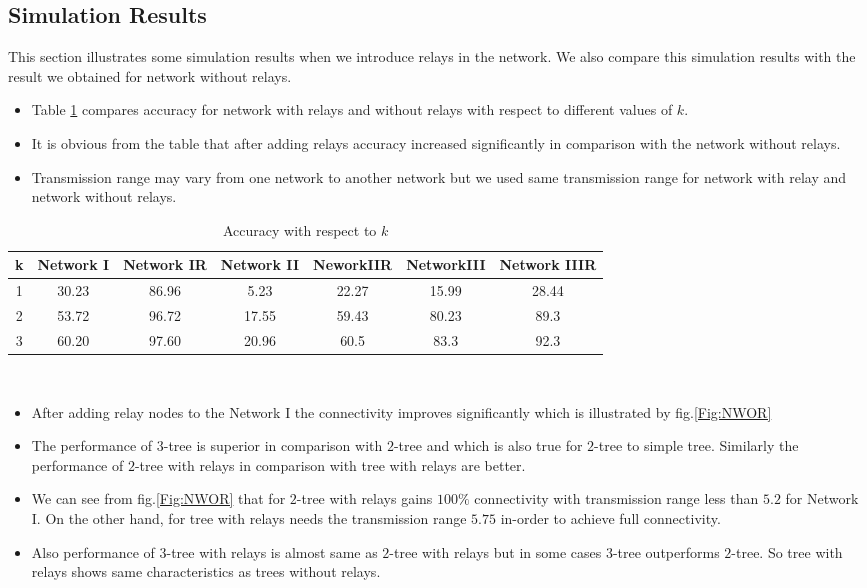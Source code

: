 \documentclass[12pt]{article}
\begin{document}
\subsection{Simulation Results}
This section illustrates some simulation results when we introduce relays in the network. We also compare this simulation results with the result we obtained for network without relays.
\begin{itemize}
\item Table \ref{Tab:SRC} compares accuracy for network with relays and without relays with respect to different values of $k$.
\item It is obvious from the table that after adding relays accuracy increased significantly in comparison with the network without relays.
\item Transmission range may vary from one network to another network but we used same transmission range for network with relay and network without relays. 

\end{itemize}


\begin{table}
 \begin{minipage}{.5\linewidth}

      \centering
     \begin{tabular}{|c|c|c|c|c|c|c|}
     \hline
     k & Network I & Network IR & Network II & NeworkIIR & NetworkIII & Network IIIR \\
     \hline
      1 & 30.23 & 86.96 & 5.23 &22.27  &15.99 & 28.44\\\hline
	  2 & 53.72 & 96.72 & 17.55 & 59.43& 80.23&89.3\\\hline
	  3 &60.20 & 97.60 & 20.96 & 60.5& 83.3&92.3\\\hline
\end{tabular}
    \end{minipage}\\
      \caption{Accuracy with respect to $k$}
      \label{Tab:SRC}   
\end{table}   
\begin{itemize}
\item After adding relay nodes to the Network I the connectivity improves significantly which is illustrated by fig.\ref{Fig:NWOR}
\item The performance of $3$-tree is superior in comparison with $2$-tree and which is also true for $2$-tree to simple tree. Similarly the performance of $2$-tree with relays in comparison with tree with relays are better.
\item  We can see from fig.\ref{Fig:NWOR} that for $2$-tree with relays gains $100\%$ connectivity with transmission range less than $5.2$ for Network I. On the other hand, for tree with relays needs the transmission range $5.75$ in-order to achieve full connectivity.
\item Also performance of $3$-tree with relays is almost same as $2$-tree with relays but in some cases $3$-tree outperforms $2$-tree. So tree with relays shows same characteristics as trees without relays. 
\end{itemize}
\end{document}
